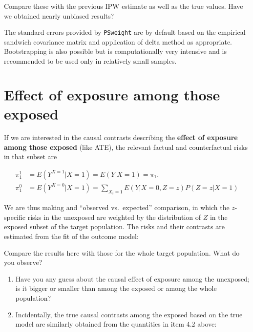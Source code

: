 \documentclass[
]{book}
\newenvironment{Shaded}{\begin{snugshade}}{\end{snugshade}}
\newcommand{\DecValTok}[1]{\textcolor[rgb]{0.00,0.00,0.81}{#1}}
\newcommand{\FunctionTok}[1]{\textcolor[rgb]{0.13,0.29,0.53}{\textbf{#1}}}
\newcommand{\NormalTok}[1]{#1}
\newcommand{\OtherTok}[1]{\textcolor[rgb]{0.56,0.35,0.01}{#1}}
\newcommand{\SpecialCharTok}[1]{\textcolor[rgb]{0.81,0.36,0.00}{\textbf{#1}}}
\begin{document}
Compare these with the previous IPW estimate as
well as the true values. Have we obtained nearly unbiased results?

The standard errors provided by \texttt{PSweight}
are by default based on the
empirical sandwich covariance matrix and application
of delta method as
appropriate. Bootstrapping is also possible but is
computationally very
intensive and is recommended to be used only in relatively small
samples.

\section{Effect of exposure among those exposed}\label{effect-of-exposure-among-those-exposed}

If we are interested in the
causal contrasts describing the \textbf{effect
of exposure among those exposed} (like ATE),
the relevant factual and
counterfactual risks in that subset are

\[
\begin{aligned}
 \pi^1_1 & = E(Y^{X=1}|X=1) = E(Y|X=1) = \pi_1, \\
 \pi^0_1 & = E(Y^{X=0}|X=1) = \sum_{X_i=1} E(Y|X=0, Z=z)P(Z=z|X=1)
\end{aligned}
\]

We are thus making and ``observed vs.~expected'' comparison,
in which the
\(z\)-specific risks in the unexposed are weighted by the
distribution of
\(Z\) in the exposed subset of the target population.
The risks and their
contrasts are estimated from the fit of the outcome model:

\begin{Shaded}
\end{Shaded}

Compare the results here with those for the whole target population. What do you observe?

\begin{enumerate}
\def\labelenumi{\arabic{enumi}.}
\setcounter{enumi}{1}
\item
  Have you any guess about the causal effect of exposure among
  the unexposed; is it bigger or smaller than among
  the exposed or among the whole population?
\item
  Incidentally, the true causal contrasts among the
  exposed based on the true model are similarly obtained
  from the quantities in item 4.2 above:
\end{enumerate}
\end{document}
